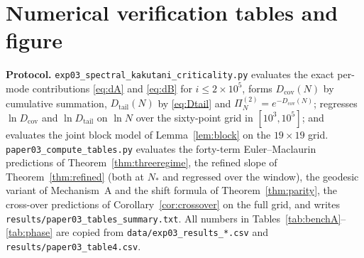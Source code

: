 \documentclass[11pt,reqno]{amsart}
\theoremstyle{plain}
\theoremstyle{definition}
\theoremstyle{remark}
\numberwithin{equation}{section}
\newcommand{\Dcov}{D_{\mathrm{cov}}}
\newcommand{\Dtail}{D_{\mathrm{tail}}}
\begin{document}
\section*{Numerical verification tables and figure}

\begin{sloppypar}
\noindent\textbf{Protocol.} \texttt{exp03\_spectral\_kakutani\_criticality.py} evaluates the exact per-mode contributions \eqref{eq:dA} and \eqref{eq:dB} for $i\le2\times10^5$, forms $\Dcov(N)$ by cumulative summation, $\Dtail(N)$ by \eqref{eq:Dtail} and $\Pi^{(2)}_N=e^{-\Dcov(N)}$; regresses $\ln\Dcov$ and $\ln\Dtail$ on $\ln N$ over the sixty-point grid in $[10^3,10^5]$; and evaluates the joint block model of Lemma~\ref{lem:block} on the $19\times19$ grid. \texttt{paper03\_compute\_tables.py} evaluates the forty-term Euler--Maclaurin predictions of Theorem~\ref{thm:threeregime}, the refined slope of Theorem~\ref{thm:refined} (both at $N_*$ and regressed over the window), the geodesic variant of Mechanism~A and the shift formula of Theorem~\ref{thm:parity}, the cross-over predictions of Corollary~\ref{cor:crossover} on the full grid, and writes \texttt{results/paper03\_tables\_summary.txt}. All numbers in Tables~\ref{tab:benchA}--\ref{tab:phase} are copied from \texttt{data/exp03\_results\_*.csv} and \texttt{results/paper03\_table4.csv}.
\end{sloppypar}
\end{document}
